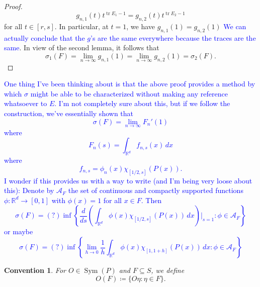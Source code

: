 \documentclass[11pt]{article}
\theoremstyle{theorem}
\newtheorem{convention}[theorem]{Convention}
\newcommand\Sym{\operatorname{Sym}}
\newcommand\tr{\operatorname{tr}}
\begin{document}
\begin{proof}
\begin{equation*}
g_{n,1}(t)t^{\tr E_1-1}=g_{n,2}(t)t^{\tr E_2-1}
\end{equation*}
for all $t\in [r,s]$. In particular, at $t=1$, we have $g_{n,1}(1)=g_{n,2}(1)$ \textcolor{blue}{We can actually conclude that the $g$'s are the same everywhere because the traces are the same}. In view of the second lemma, it follows that
\begin{equation*}
\sigma_1(F)=\lim_{n\to\infty}g_{n,1}(1)=\lim_{n\to\infty}g_{n,2}(1)=\sigma_2(F).
\end{equation*}
\end{proof}

\noindent \textcolor{blue}{One thing I've been thinking about is that the above proof provides a method by which $\sigma$ might be able to be characterized without making any reference whatsoever to $E$. I'm not completely sure about this, but if we follow the construction, we've essentially shown that
\begin{equation*}
\sigma(F)=\lim_{n\to\infty}F_n'(1)
\end{equation*}
where
\begin{equation*}
F_n(s)=\int_{\mathbb{R}^d}f_{n,s}(x)\,dx
\end{equation*}
where
\begin{equation*}
f_{n,s}=\phi_n(x)\chi_{[1/2,s]}(P(x)).
\end{equation*}
I wonder if this provides us with a way to write (and I'm being very loose about this): Denote by $\mathcal{A}_F$ the set of continuous and compactly supported functions $\phi:\mathbb{R}^d\to [0,1]$ with $\phi(x)=1$ for all $x\in F$. Then
\begin{equation*}
\sigma(F)=(?)\inf\left\{\frac{d}{ds}\left(\int_{\mathbb{R}^d}\phi(x)\chi_{[1/2,s]}(P(x))\,dx\right)\bigg\vert_{s=1}:\phi\in \mathcal{A}_F\right\}
\end{equation*}
or maybe
\begin{equation*}
\sigma(F)=(?)\inf\left\{\lim_{h\to 0}\frac{1}{h}\int_{\mathbb{R}^d}\phi(x)\chi_{[1,1+h]}(P(x))\,dx:\phi\in \mathcal{A}_F\right\}
\end{equation*}
}







\begin{convention}
For $O\in \Sym(P)$ and $F\subseteq S$, we define
\begin{equation*}
    O(F) \coloneqq \{ O \eta : \eta \in F \}.
\end{equation*}
\end{convention}
\end{document}
